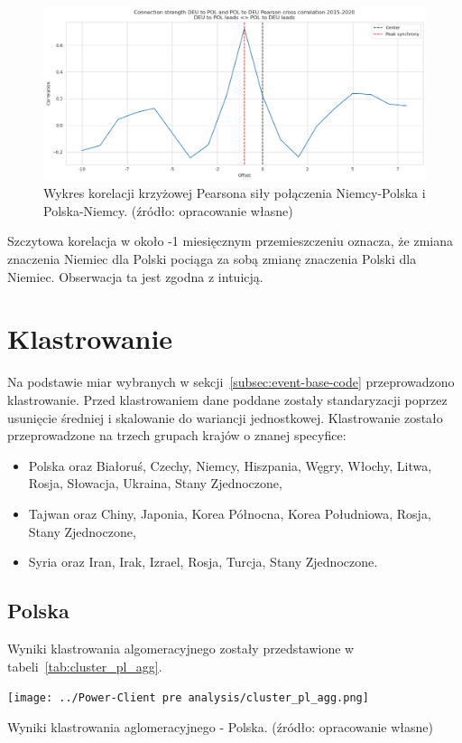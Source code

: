 \documentclass[11pt]{report}
\begin{document}
    \begin{figure}[!ht]
        \centering
        \includegraphics[width=\linewidth]{../spade_proto/figures/auto_seek/connection strength/cross_correlation/Connection strength DEU to POL and POL to DEU Pearson cross correlation 2015-2020 1M.png}
        \caption{Wykres korelacji krzyżowej Pearsona siły połączenia
        Niemcy-Polska i Polska-Niemcy. (źródło: opracowanie własne)}
        \label{fig:Connection strength DEU to POL and POL to DEU Pearson cross correlation 2015-2020}
    \end{figure}

    Szczytowa korelacja w około -1 miesięcznym przemieszczeniu oznacza, że zmiana znaczenia Niemiec dla Polski pociąga za sobą zmianę znaczenia Polski dla Niemiec.
    Obserwacja ta jest zgodna z intuicją.


    \section{Klastrowanie}\label{sec:klastrowanie}
    Na podstawie miar wybranych w sekcji~\ref{subsec:event-base-code} przeprowadzono klastrowanie.
    Przed klastrowaniem dane poddane zostały standaryzacji poprzez usunięcie średniej i skalowanie do wariancji jednostkowej.
    Klastrowanie zostało przeprowadzone na trzech grupach krajów o znanej specyfice:
    \begin{itemize}
        \item Polska oraz Białoruś, Czechy, Niemcy, Hiszpania, Węgry, Włochy, Litwa, Rosja, Słowacja, Ukraina, Stany Zjednoczone,
        \item Tajwan oraz Chiny, Japonia, Korea Północna, Korea Południowa, Rosja, Stany Zjednoczone,
        \item Syria oraz Iran, Irak, Izrael, Rosja, Turcja, Stany Zjednoczone.
    \end{itemize}

    \subsection{Polska}
    Wyniki klastrowania algomeracyjnego zostały przedstawione w tabeli~\ref{tab:cluster_pl_agg}.
    \begin{table}[!htp]
        \centering
        \texttt{[image: ../Power-Client pre analysis/cluster\_pl\_agg.png]}
        \caption{Wyniki klastrowania aglomeracyjnego - Polska. (źródło: opracowanie własne)}
        \label{tab:cluster_pl_agg}
    \end{table}
\end{document}
